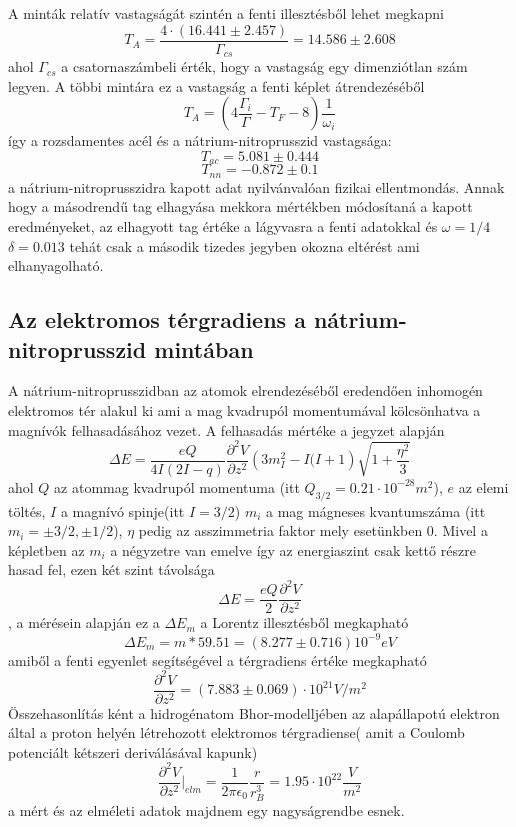 \documentclass[a4paper,12pt]{article}
\numberwithin{equation}{subsection}
\begin{document}
A minták relatív vastagságát szintén a fenti illesztésből lehet megkapni \[T_A=\frac{4\cdot (16.441\pm2.457)}{\Gamma_{cs}}=14.586\pm2.608\] ahol $\Gamma_{cs}$ a csatornaszámbeli érték, hogy a vastagság egy dimenziótlan szám legyen. A többi mintára ez a vastagság a fenti képlet átrendezéséből \[T_A=\left(4\frac{\Gamma_i}{\Gamma}-T_F-8\right)\frac{1}{\omega_i}\] így a rozsdamentes acél és a nátrium-nitroprusszid vastagsága:
\[T_{ac}=5.081\pm0.444\]
\[T_{nn}=-0.872\pm0.1\] a nátrium-nitroprusszidra kapott adat nyilvánvalóan fizikai ellentmondás.
Annak hogy a másodrendű tag elhagyása mekkora mértékben módosítaná a kapott eredményeket, az elhagyott tag értéke a lágyvasra a fenti adatokkal és $\omega=1/4$ $\delta=0.013$ tehát csak a második tizedes jegyben okozna eltérést ami elhanyagolható.
\subsection{Az elektromos térgradiens a nátrium-nitroprusszid mintában}
A nátrium-nitroprusszidban az atomok elrendezéséből eredendően inhomogén elektromos tér alakul ki ami a mag kvadrupól momentumával kölcsönhatva a magnívók felhasadásához vezet. A felhasadás mértéke a jegyzet alapján \[\Delta E=\frac{eQ}{4I(2I-q)}\frac{\partial^2 V}{\partial z^2}\left(3m^2_I-I(I+1\right)\sqrt{1+\frac{\eta^2}{3}}\] ahol $Q$ az atommag kvadrupól momentuma (itt $Q_{3/2}=0.21\cdot10^{-28}m^2$), $e$ az elemi töltés, $I$ a magnívó spinje(itt $I=3/2$) $m_i$ a mag mágneses kvantumszáma (itt $m_i=\pm3/2, \pm1/2$), $\eta$ pedig az asszimmetria faktor mely esetünkben 0. Mivel a képletben az $m_i$ a négyzetre van emelve így az energiaszint csak kettő részre hasad fel, ezen két szint távolsága
\[\Delta E=\frac{eQ}{2} \frac{\partial^2 V}{\partial z^2}\], a mérésein alapján ez a $\Delta E_m$ a Lorentz illesztésből megkapható
\[\Delta E_m=m*59.51=(8.277\pm0.716)10^{-9}eV\]
amiből a fenti egyenlet segítségével a térgradiens értéke megkapható 
\[\frac{\partial^2 V}{\partial z^2}=(7.883 \pm 0.069)\cdot10^{21} V/m^2\]
Összehasonlítás ként a hidrogénatom Bhor-modelljében az alapállapotú elektron által a proton helyén létrehozott elektromos térgradiense( amit a Coulomb potenciált kétszeri deriválásával kapunk)  \[\frac{\partial^2 V}{\partial z^2} \vert_{elm}=\frac{1}{2\pi\epsilon_0}\frac{r}{r^3_B}=1.95\cdot10^{22}\frac{V}{m^2}\] a mért és az elméleti adatok majdnem egy nagyságrendbe esnek.
\end{document}
